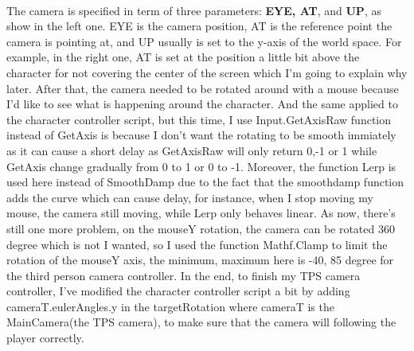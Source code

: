 \documentclass[a4paper, 13pt]{extarticle}
\begin{document}
  	\\[0.05cm]
 	 The camera is specified in term of three parameters: {\bfseries EYE, AT}, and {\bfseries UP}, as show in the left one. EYE is the camera position, AT is the reference point the camera is pointing at, and UP usually is set to the y-axis of the world space. For example, in the right one, AT is set at the position a little bit above the character for not covering the center of the screen which I'm going to explain why later.
 	 After that, the camera needed to be rotated around with a mouse because I'd like to see what is happening around the character. And the same applied to the character controller script, but this time, I use Input.GetAxisRaw function instead of GetAxis is because I don't want the rotating to be smooth immiately as it can cause a short delay as GetAxisRaw will only return 0,-1 or 1 while GetAxis change gradually from 0 to 1 or 0 to -1.  
 	 Moreover, the function Lerp is used here instead of SmoothDamp due to the fact that the smoothdamp function adds the curve which can cause delay, for instance, when I stop moving my mouse, the camera still moving, while Lerp only behaves linear. As now, there's still one more problem, on the mouseY rotation, the camera can be rotated 360 degree which is not I wanted, so I used the function Mathf.Clamp to limit the rotation of the mouseY axis, the minimum, maximum here is -40, 85 degree for the third person camera controller. In the end, to finish my TPS camera controller, I've modified the character controller script a bit by adding cameraT.eulerAngles.y in the targetRotation where cameraT is the MainCamera(the TPS camera), to make sure that the camera will following the player correctly.
 	 
\end{document}
